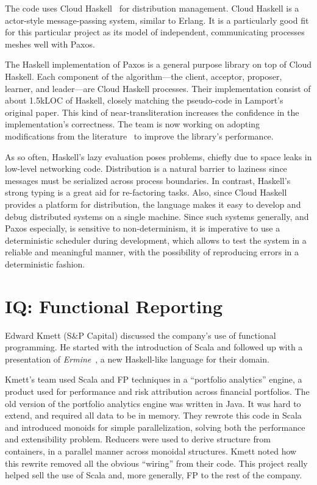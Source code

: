 \documentclass{jfp1}
\begin{document}
The code uses Cloud Haskell~\cite{Epstein:2011:Towards} for distribution
management. Cloud Haskell is a actor-style message-passing system, similar
to Erlang. It is a particularly good fit for this particular project as its
model of independent, communicating processes meshes well with Paxos.

The Haskell implementation of Paxos is a general purpose library on top of
Cloud Haskell. Each component of the algorithm---the client, acceptor,
proposer, learner, and leader---are Cloud Haskell processes.  Their
implementation consist of about 1.5kLOC of Haskell, closely matching the
pseudo-code in Lamport's original paper.  This kind of near-transliteration
increases the confidence in the implementation's correctness. The team is
now working on adopting modifications from the
literature~\cite{Chandra:2007:Paxos} to improve the library's performance.

As so often, Haskell's lazy evaluation poses problems, chiefly due to space
leaks in low-level networking code. Distribution is a natural barrier to
laziness since messages must be serialized across process boundaries. In
contrast, Haskell's strong typing is a great aid for re-factoring
tasks. Also, since Cloud Haskell provides a platform for distribution, the
language makes it easy to develop and debug distributed systems on a single
machine.  Since such systems generally, and Paxos especially, is sensitive
to non-determinism, it is imperative to use a deterministic scheduler
during development, which allows to test the system in a reliable and
meaningful manner, with the possibility of reproducing errors in a
deterministic fashion. 

\section{IQ: Functional Reporting}


Edward Kmett (S\&P Capital) discussed the company's use of functional
programming. He started with the introduction of Scala and followed up with
a presentation of \textit{Ermine}~\cite{Compall:2014:Ermine}, a new
Haskell-like language for their domain.

Kmett's team used Scala and FP techniques in a ``portfolio analytics''
engine, a product used for performance and risk attribution across
financial portfolios. The old version of the portfolio analytics engine was
written in Java.  It was hard to extend, and required all data to be in
memory. They rewrote this code in Scala and introduced monoids for simple
parallelization, solving both the performance and extensibility problem.
Reducers were used to derive structure from containers, in a parallel
manner across monoidal structures. Kmett noted how this rewrite removed all
the obvious ``wiring'' from their code.  This project really helped sell
the use of Scala and, more generally, FP to the rest of the company.
\end{document}
